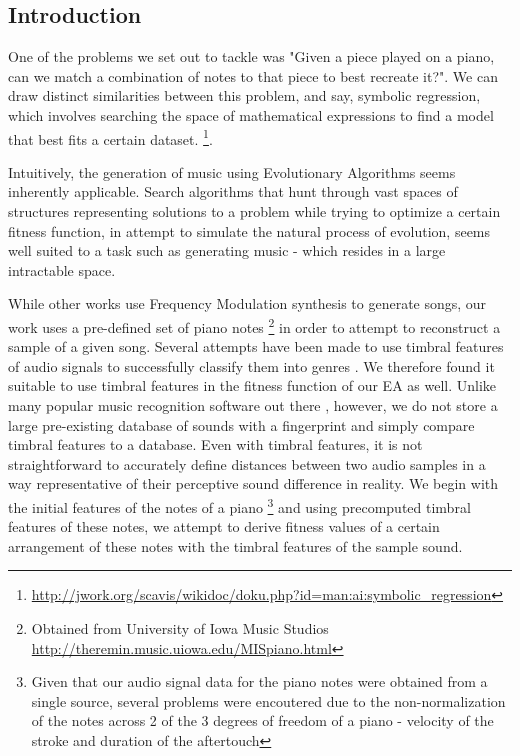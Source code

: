 \documentclass{pnastwo}
\begin{document}
\begin{article}
\section{Introduction}
One of the problems we set out to tackle was "Given a piece played on a piano, can we match a combination of notes to that piece to best recreate it?". We can draw distinct similarities between this problem, and say, symbolic regression, which involves searching the space of mathematical expressions to find a model that best fits a certain dataset. \footnote{\url{http://jwork.org/scavis/wikidoc/doku.php?id=man:ai:symbolic_regression}}. 

Intuitively, the generation of music using Evolutionary Algorithms seems inherently applicable. Search algorithms that hunt through vast spaces of structures representing solutions to a problem while trying to optimize a certain fitness function, in attempt to simulate the natural process of evolution, seems well suited to a task such as generating music - which resides in a large intractable space. 

While other works \cite{lai} \cite{garcia} use Frequency Modulation synthesis to generate songs, our work uses a pre-defined set of piano notes \footnote{Obtained from University of Iowa Music Studios \url{http://theremin.music.uiowa.edu/MISpiano.html}} in order to attempt to reconstruct a sample of a given song. Several attempts have been made to use timbral features of audio signals to successfully classify them into genres \cite{germ} \cite{gtzan}. We therefore found it suitable to use timbral features in the fitness function of our EA as well. Unlike many popular music recognition software out there  \cite{wang}, however, we do not store a large pre-existing database of sounds with a fingerprint and simply compare timbral features to a database. Even with timbral features, it is not straightforward to accurately define distances between two audio samples in a way representative of their perceptive sound difference in reality. We begin with the initial features of the notes of a piano \footnote{Given that our audio signal data for the piano notes were obtained from a single source, several problems were encoutered due to the non-normalization of the notes across 2 of the 3 degrees of freedom of a piano - velocity of the stroke and duration of the aftertouch} and using precomputed timbral features of these notes, we attempt to derive fitness values of a certain arrangement of these notes with the timbral features of the sample sound. 


\end{article}
\end{document}
